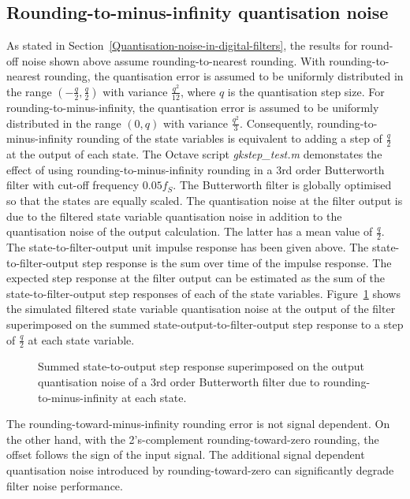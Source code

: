 \documentclass[a4paper,twoside,10pt,english]{report}
\begin{document}
\subsection{Rounding-to-minus-infinity quantisation noise}
As stated in Section~\ref{Quantisation-noise-in-digital-filters}, the results
for round-off noise shown above assume rounding-to-nearest rounding. With
rounding-to-nearest rounding, the quantisation error is assumed to be 
uniformly distributed in the range $\left(-\frac{q}{2},\frac{q}{2}\right)$
with variance $\frac{q^{2}}{12}$, where $q$ is the quantisation step size. For 
rounding-to-minus-infinity, the quantisation error is assumed to be 
uniformly distributed in the range $\left(0,q\right)$ with variance 
$\frac{q^{2}}{3}$. Consequently, rounding-to-minus-infinity rounding of the
state variables is equivalent to adding a step of $\frac{q}{2}$ at the
output of each state. The Octave script \emph{gkstep\_test.m} demonstates the
effect of using rounding-to-minus-infinity rounding in a $3$rd order Butterworth 
filter with cut-off frequency $0.05f_{S}$. The Butterworth filter is globally 
optimised so that the states are equally scaled. The quantisation noise at the 
filter output is due to the filtered state variable quantisation noise in
addition to the quantisation noise of the output calculation. The latter has a
mean value of $\frac{q}{2}$. The state-to-filter-output unit impulse response 
has been given above. The state-to-filter-output step response is the sum 
over time of the impulse response. The expected step response at the filter 
output can be estimated as the sum of the state-to-filter-output step 
responses of each of the state variables. Figure~\ref{fig:gkstep-test-noise} 
shows the simulated filtered state variable quantisation noise at the 
output of the filter superimposed on the summed state-output-to-filter-output
step response to a step of $\frac{q}{2}$ at each state variable.

\begin{figure}[!htbp]
\begin{center}
\scalebox{0.7}{}
\caption{Summed state-to-output step response superimposed on the output quantisation noise of a 3rd order Butterworth filter due to rounding-to-minus-infinity at each state.}
\label{fig:gkstep-test-noise}
\end{center}
\end{figure}

The rounding-toward-minus-infinity rounding error is not signal dependent.
On the other hand, with the 2's-complement rounding-toward-zero rounding,
 the offset follows the sign of the input signal. The additional signal
dependent quantisation noise introduced by rounding-toward-zero can
significantly degrade filter noise performance.
\end{document}

